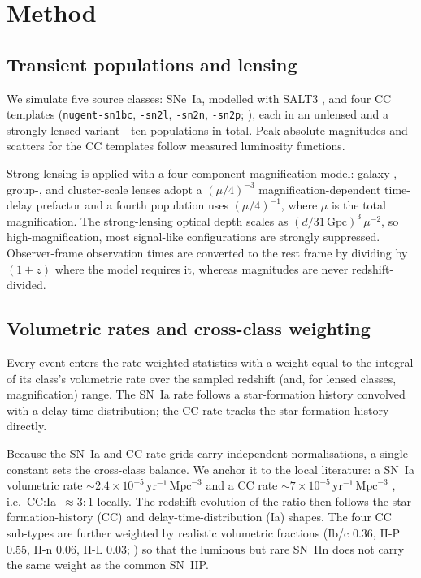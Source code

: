 \documentclass[fleqn,usenatbib]{mnras}
\begin{document}
\section{Method}
\label{sec:method}

\subsection{Transient populations and lensing}
\label{sec:populations}

We simulate five source classes: SNe~Ia, modelled with SALT3
\citep{Kenworthy2021}, and four CC templates
(\texttt{nugent-sn1bc}, \texttt{-sn2l}, \texttt{-sn2n}, \texttt{-sn2p};
\citealt{Nugent2002}), each in an unlensed and a strongly lensed variant---ten
populations in total. Peak absolute magnitudes and scatters for the CC templates
follow measured luminosity functions.

Strong lensing is applied with a four-component magnification model: galaxy-,
group-, and cluster-scale lenses adopt a $(\mu/4)^{-3}$ magnification-dependent
time-delay prefactor and a fourth population uses $(\mu/4)^{-1}$, where $\mu$ is
the total magnification. The strong-lensing optical depth scales as
$(d/31\,\mathrm{Gpc})^{3}\,\mu^{-2}$, so high-magnification, most
signal-like configurations are strongly suppressed. Observer-frame observation
times are converted to the rest frame by dividing by $(1+z)$ where the model
requires it, whereas magnitudes are never redshift-divided.

\subsection{Volumetric rates and cross-class weighting}
\label{sec:rates}

Every event enters the rate-weighted statistics with a weight equal to the
integral of its class's volumetric rate over the sampled redshift (and, for
lensed classes, magnification) range. The SN~Ia rate follows a
\citet{Madau2014} star-formation history convolved with a delay-time
distribution; the CC rate tracks the star-formation history directly.

Because the SN~Ia and CC rate grids carry independent normalisations, a single
constant sets the cross-class balance. We anchor it to the local literature: a
SN~Ia volumetric rate $\sim\!2.4\times10^{-5}\,\mathrm{yr}^{-1}\,\mathrm{Mpc}^{-3}$
\citep{Frohmaier2019} and a CC rate
$\sim\!7\times10^{-5}\,\mathrm{yr}^{-1}\,\mathrm{Mpc}^{-3}$
\citep{Li2011,Taylor2014}, i.e.\ CC:Ia~$\approx3\!:\!1$ locally. The redshift
evolution of the ratio then follows the star-formation-history (CC) and
delay-time-distribution (Ia) shapes. The four CC sub-types are further weighted
by realistic volumetric fractions
(Ib/c 0.36, II-P 0.55, II-n 0.06, II-L 0.03; \citealt{Li2011,Shivvers2017}) so
that the luminous but rare SN~IIn does not carry the same weight as the common
SN~IIP.
\end{document}

